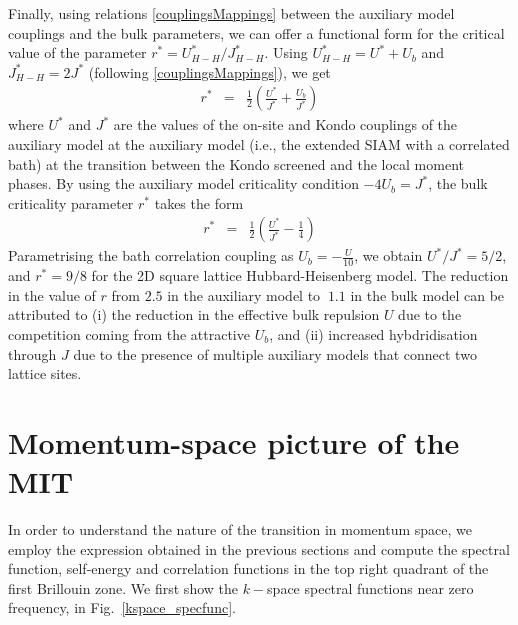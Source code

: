 \documentclass[reprint,hidelinks]{revtex4-2}
\begin{document}
\begin{widetext}
Finally, using relations \eqref{couplingsMappings} between the auxiliary model couplings and the bulk parameters, we can offer a functional form for the critical value of the parameter $r^{*} = U_{H-H}^{*}/J_{H-H}^{*}$. Using \(U_{H-H}^{*} = U^* + U_b\) and \(J_{H-H}^{*} = 2J^*\) (following \eqref{couplingsMappings}), we get
\begin{equation}\begin{aligned}
	r^{*} &=& \frac{1}{2}\left(\frac{U^{*}}{J^{*}} + \frac{U_b}{J^*}\right)
\end{aligned}\end{equation}
where $U^{*}$ and $J^{*}$ are the values of the on-site and Kondo couplings of the auxiliary model at the auxiliary model (i.e., the extended SIAM with a correlated bath) at the transition between the Kondo screened and the local moment phases. By using the auxiliary model criticality condition \(-4U_b = J^*\), the bulk criticality parameter \(r^*\) takes the form
\begin{equation}\begin{aligned}
	r^{*} &=& \frac{1}{2}\left(\frac{U^{*}}{J^{*}} - \frac{1}{4}\right)
\end{aligned}\end{equation}
Parametrising the bath correlation coupling as $U_{b}=-\frac{U}{10}$, we obtain $U^{*}/J^{*}=5/2$, and $r^{*} = 9/8$ for the 2D square lattice Hubbard-Heisenberg model. The reduction in the value of \(r\) from \(2.5\) in the auxiliary model to \(~1.1\) in the bulk model can be attributed to (i) the reduction in the effective bulk repulsion \(U\) due to the competition coming from the attractive \(U_b\), and (ii) increased hybdridisation through \(J\) due to the presence of multiple auxiliary models that connect two lattice sites.

\section{Momentum-space picture of the MIT}
In order to understand the nature of the transition in momentum space, we employ the expression obtained in the previous sections and compute the spectral function, self-energy and correlation functions in the top right quadrant of the first Brillouin zone. We first show the \(k-\)space spectral functions near zero frequency, in Fig.~\ref{kspace_specfunc}.


\end{widetext}
\end{document}
